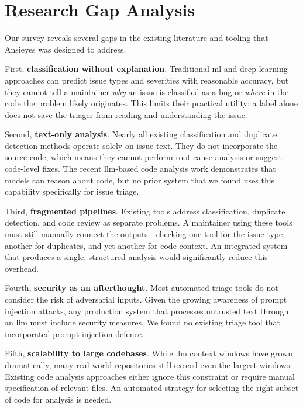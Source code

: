 \section{\textbf{Research Gap Analysis}}

Our survey reveals several gaps in the existing literature and tooling that Ansieyes was designed to address.

First, \textbf{classification without explanation}. Traditional \gls{ml} and deep learning approaches can predict issue types and severities with reasonable accuracy, but they cannot tell a maintainer \textit{why} an issue is classified as a bug or \textit{where} in the code the problem likely originates. This limits their practical utility: a label alone does not save the triager from reading and understanding the issue.

Second, \textbf{text-only analysis}. Nearly all existing classification and duplicate detection methods operate solely on issue text. They do not incorporate the source code, which means they cannot perform root cause analysis or suggest code-level fixes. The recent \gls{llm}-based code analysis work demonstrates that models can reason about code, but no prior system that we found uses this capability specifically for issue triage.

Third, \textbf{fragmented pipelines}. Existing tools address classification, duplicate detection, and code review as separate problems. A maintainer using these tools must still manually connect the outputs---checking one tool for the issue type, another for duplicates, and yet another for code context. An integrated system that produces a single, structured analysis would significantly reduce this overhead.

Fourth, \textbf{security as an afterthought}. Most automated triage tools do not consider the risk of adversarial inputs. Given the growing awareness of prompt injection attacks, any production system that processes untrusted text through an \gls{llm} must include security measures. We found no existing triage tool that incorporated prompt injection defence.

Fifth, \textbf{scalability to large codebases}. While \gls{llm} context windows have grown dramatically, many real-world repositories still exceed even the largest windows. Existing code analysis approaches either ignore this constraint or require manual specification of relevant files. An automated strategy for selecting the right subset of code for analysis is needed.

